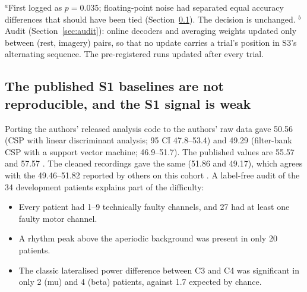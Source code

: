 \begin{table}[t]

\raggedright\footnotesize $^a$First logged as $p = 0.035$; floating-point noise had separated equal accuracy differences that should have been tied (Section~\ref{sec:pitfalls}). The decision is unchanged.
$^b$Audit (Section~\ref{sec:audit}): online decoders and averaging weights updated only between (rest, imagery) pairs, so that no update carries a trial's position in S3's alternating sequence. The pre-registered runs updated after every trial.
\end{table}

\subsection{The published S1 baselines are not reproducible, and the S1 signal is weak}
\label{sec:pitfalls}

Porting the authors' released analysis code to the authors' raw data gave 50.56\pct{} (CSP with linear discriminant analysis; 95\pct{} CI 47.8--53.4) and 49.29\pct{} (filter-bank CSP with a support vector machine; 46.9--51.7). The published values are 55.57\pct{} and 57.57\pct{} \citep{liu2024}. The cleaned recordings gave the same (51.86\pct{} and 49.17\pct{}), which agrees with the 49.46--51.82\pct{} reported by others on this cohort \citep{via2026}. A label-free audit of the 34 development patients explains part of the difficulty:
\begin{itemize}
  \item Every patient had 1--9 technically faulty channels, and 27 had at least one faulty motor channel.
  \item A rhythm peak above the aperiodic background was present in only 20 patients.
  \item The classic lateralised power difference between C3 and C4 was significant in only 2 (mu) and 4 (beta) patients, against 1.7 expected by chance.
\end{itemize}

